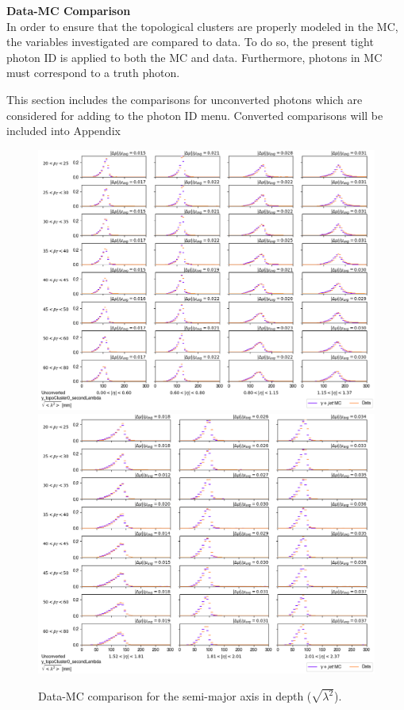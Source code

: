 \noindent\textbf{Data-MC Comparison}\\
\indent In order to ensure that the topological clusters are properly modeled in the \gls{MC}, the variables investigated are compared to data. To do so, the present tight photon ID is applied to both the \gls{MC} and data. Furthermore, photons in \gls{MC} must correspond to a truth photon. 

This section includes the comparisons for unconverted photons which are considered for adding to the photon ID menu. Converted comparisons will be included into Appendix 



\begin{figure}[!thp]
    \centering
    \includegraphics[width=.80\textwidth]{chapters/chapter4_photonID/images/y_topoCluster0_secondLambda_Unconverted_lowerEta.png}
    \includegraphics[width=.80\textwidth]{chapters/chapter4_photonID/images/y_topoCluster0_secondLambda_Unconverted_upperEta.png}
    \caption{Data-MC comparison for the semi-major axis in depth ($\sqrt{\lambda^2}$).}
\end{figure}
